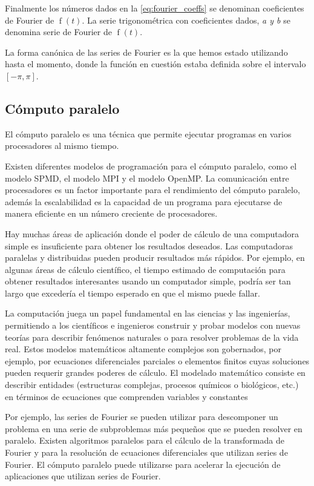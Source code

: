 Finalmente los números dados en la \cref{eq:fourier_coeffs} se denominan coeficientes de Fourier de \(\operatorname{f}(t)\). La serie trigonométrica con coeficientes dados, \emph{a y b} se denomina serie de Fourier de \(\operatorname{f}(t)\).

La forma canónica de las series de Fourier es la que hemos estado utilizando hasta el momento, donde la función en cuestión estaba definida sobre el intervalo \([-\pi, \pi]\).

\subsection{Cómputo paralelo}

El cómputo paralelo es una técnica que permite ejecutar programas en varios procesadores al mismo tiempo.

Existen diferentes modelos de programación para el cómputo paralelo, como el modelo SPMD, el modelo MPI y el modelo OpenMP. La comunicación entre procesadores es un factor importante para el rendimiento del cómputo paralelo, además la escalabilidad es la capacidad de un programa para ejecutarse de manera eficiente en un número creciente de procesadores.

Hay muchas áreas de aplicación donde el poder de cálculo de una computadora simple es insuficiente para obtener los resultados deseados. Las computadoras paralelas y distribuidas pueden producir resultados más rápidos. Por ejemplo, en algunas áreas de cálculo científico, el tiempo estimado de computación para obtener resultados interesantes usando un computador simple, podría ser tan largo que excedería el tiempo esperado en que el mismo puede fallar.

La computación juega un papel fundamental en las ciencias y las ingenierías, permitiendo a los científicos e ingenieros construir y probar modelos con nuevas teorías para describir fenómenos naturales o para resolver problemas de la vida real. Estos modelos matemáticos altamente complejos son gobernados, por ejemplo, por ecuaciones diferenciales parciales o elementos finitos cuyas soluciones pueden requerir grandes poderes de cálculo. El modelado matemático consiste en describir entidades (estructuras complejas, procesos químicos o biológicos, etc.) en términos de ecuaciones que comprenden variables y constantes

Por ejemplo, las series de Fourier se pueden utilizar para descomponer un problema en una serie de subproblemas más pequeños que se pueden resolver en paralelo. Existen algoritmos paralelos para el cálculo de la transformada de Fourier y para la resolución de ecuaciones diferenciales que utilizan series de Fourier. El cómputo paralelo puede utilizarse para acelerar la ejecución de aplicaciones que utilizan series de Fourier.

